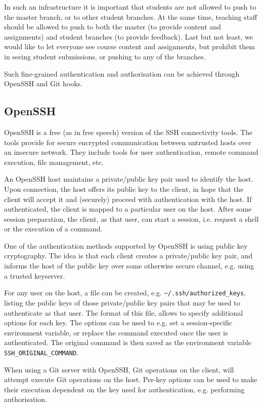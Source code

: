 In such an infrastructure it is important that students are not allowed to push
to the master branch, or to other student branches. At the same time, teaching
staff should be allowed to push to both the master (to provide content and
assignments) and student branches (to provide feedback). Last but not least, we
would like to let everyone see course content and assignments, but prohibit
them in seeing student submissions, or pushing to any of the branches.

Such fine-grained authentication and authorisation can be achieved through
OpenSSH and Git hooks.

\subsection{OpenSSH}

OpenSSH is a free (as in free speech) version of the SSH connectivity
tools\cite{openssh-com-2014}.  The tools provide for secure encrypted
communication between untrusted hosts over an insecure network\cite{man-1-ssh}.
They include tools for user authentication, remote command execution, file
management, etc.

An OpenSSH host maintains a private/public key pair used to identify the host.
Upon connection, the host offers its public key to the client, in hope that the
client will accept it and (securely) proceed with authentication with the host.
If authenticated, the client is mapped to a particular user on the host.  After
some session preparation, the client, as that user, can start a session, i.e.
request a shell or the execution of a command.

One of the authentication methods supported by OpenSSH is using public key
cryptography. The idea is that each client creates a private/public key pair,
and informs the host of the public key over some otherwise secure channel, e.g.
using a trusted keyserver.

For any user on the host, a file can be created, e.g.
\texttt{\textasciitilde/.ssh/authorized\_keys}, listing the public keys of
those private/public key pairs that may be used to authenticate as that user.
The format of this file\cite{man-8-sshd}, allows to specify additional options
for each key. The options can be used to e.g. set a session-specific
environment variable, or replace the command executed once the user is
authenticated. The original command is then saved as the environment variable
\texttt{SSH\_ORIGINAL\_COMMAND}.

When using a Git server with OpenSSH, Git operations on the client, will
attempt execute Git operations on the host. Per-key options can be used to make
their execution dependent on the key used for authentication, e.g. performing
authorisation.

